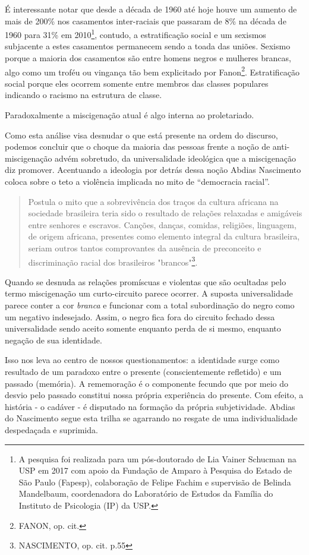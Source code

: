 É interessante notar que desde a década de 1960 até hoje houve um
aumento de mais de 200\% nos casamentos inter-raciais que passaram de
8\% na década de 1960 para 31\% em 2010\footnote{A pesquisa foi
  realizada para um pós-doutorado de Lia Vainer Schucman na USP em 2017
  com apoio da Fundação de Amparo à Pesquisa do Estado de São Paulo
  (Fapesp), colaboração de Felipe Fachim e supervisão de Belinda
  Mandelbaum, coordenadora do Laboratório de Estudos da Família do
  Instituto de Psicologia (IP) da USP.}, contudo, a estratificação
social e um sexismos subjacente a estes casamentos permanecem sendo a
toada das uniões. Sexismo porque a maioria dos casamentos são entre
homens negros e mulheres brancas, algo como um troféu ou vingança tão
bem explicitado por Fanon\footnote{FANON, op. cit.}. Estratificação
social porque eles ocorrem somente entre membros das classes populares
indicando o racismo na estrutura de classe.

Paradoxalmente a miscigenação atual é algo interna ao proletariado.

Como esta análise visa desnudar o que está presente na ordem do
discurso, podemos concluir que o choque da maioria das pessoas frente a
noção de anti-miscigenação advém sobretudo, da universalidade ideológica
que a miscigenação diz promover. Acentuando a ideologia por detrás dessa
noção Abdias Nascimento coloca sobre o teto a violência implicada no
mito de ``democracia racial''.

\begin{quote}
Postula o mito que a sobrevivência dos traços da cultura africana na
sociedade brasileira teria sido o resultado de relações relaxadas e
amigáveis entre senhores e escravos. Canções, danças, comidas,
religiões, linguagem, de origem africana, presentes como elemento
integral da cultura brasileira, seriam outros tantos comprovantes da
ausência de preconceito e discriminação racial dos brasileiros
"brancos"\footnote{NASCIMENTO, op. cit. p.55}.
\end{quote}

Quando se desnuda as relações promíscuas e violentas que são ocultadas
pelo termo miscigenação um curto-circuito parece ocorrer. A suposta
universalidade parece conter a cor \emph{branca} e funcionar com a total
subordinação do negro como um negativo indesejado. Assim, o negro fica
fora do circuito fechado dessa universalidade sendo aceito somente
enquanto perda de si mesmo, enquanto negação de sua identidade.

Isso nos leva ao centro de nossos questionamentos: a identidade surge
como resultado de um paradoxo entre o presente (conscientemente
refletido) e um passado (memória). A rememoração é o componente fecundo
que por meio do desvio pelo passado constitui nossa própria experiência
do presente. Com efeito, a história - o cadáver - é disputado na
formação da própria subjetividade. Abdias do Nascimento segue esta
trilha se agarrando no resgate de uma individualidade despedaçada e
suprimida.

